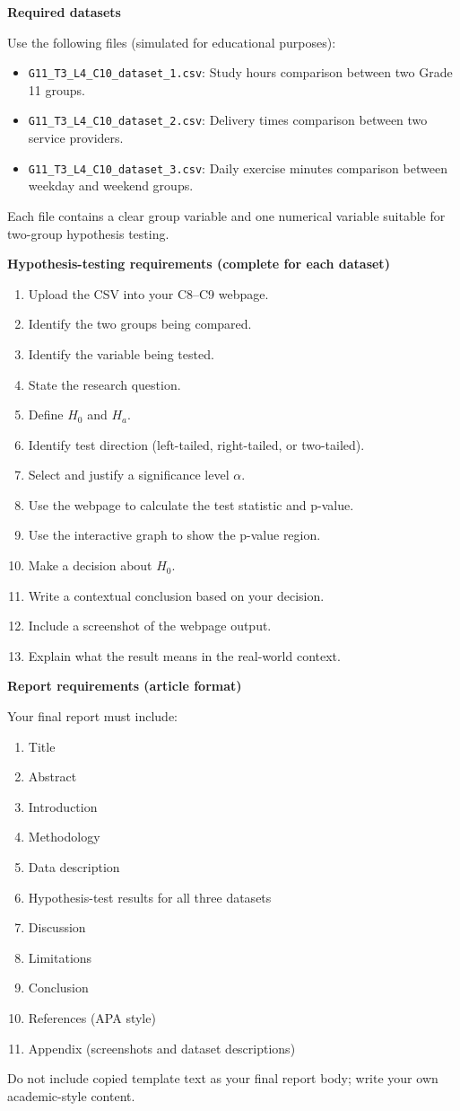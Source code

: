 \documentclass[12pt]{article}
\newcommand{\SubsectionBox}[1]{%
\noindent\colorbox{gray!30}{%
\parbox{\linewidth}{\textbf{#1}}%
}\par\vspace{0.35cm}%
}
\begin{document}
\SubsectionBox{Required datasets}
Use the following files (simulated for educational purposes):
\begin{itemize}
\item \texttt{G11\_T3\_L4\_C10\_dataset\_1.csv}: Study hours comparison between two Grade 11 groups.
\item \texttt{G11\_T3\_L4\_C10\_dataset\_2.csv}: Delivery times comparison between two service providers.
\item \texttt{G11\_T3\_L4\_C10\_dataset\_3.csv}: Daily exercise minutes comparison between weekday and weekend groups.
\end{itemize}
Each file contains a clear group variable and one numerical variable suitable for two-group hypothesis testing.

\SubsectionBox{Hypothesis-testing requirements (complete for each dataset)}
\begin{enumerate}
\item Upload the CSV into your C8--C9 webpage.
\item Identify the two groups being compared.
\item Identify the variable being tested.
\item State the research question.
\item Define \(H_0\) and \(H_a\).
\item Identify test direction (left-tailed, right-tailed, or two-tailed).
\item Select and justify a significance level \(\alpha\).
\item Use the webpage to calculate the test statistic and p-value.
\item Use the interactive graph to show the p-value region.
\item Make a decision about \(H_0\).
\item Write a contextual conclusion based on your decision.
\item Include a screenshot of the webpage output.
\item Explain what the result means in the real-world context.
\end{enumerate}

\SubsectionBox{Report requirements (article format)}
Your final report must include:
\begin{enumerate}
\item Title
\item Abstract
\item Introduction
\item Methodology
\item Data description
\item Hypothesis-test results for all three datasets
\item Discussion
\item Limitations
\item Conclusion
\item References (APA style)
\item Appendix (screenshots and dataset descriptions)
\end{enumerate}
Do not include copied template text as your final report body; write your own academic-style content.
\end{document}
